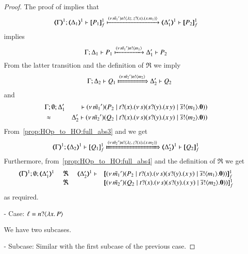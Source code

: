 \begin{proof}
	\noi The proof of  implies that
%
	\[
		\horel{\mapt{\Gamma}^{1}}{\mapt{\Delta_1}^{1}}{\pmapp{P_1}{1}{f}}{\hby{\news{\tilde{m_1}'} \bactout{n}{\abs{z}{\binp{z}{x} (\appl{x}{m_1})}}}}{\mapt{\Delta_1'}^{1}}{\pmapp{P_2}{1}{f}}
	\]
%
	\noi implies
%
	\[
		\Gamma; \Delta_1 \vdash P_1 \xmapsto{(\nu\, \tilde{m_1}') n !\langle m_1 \rangle} \Delta_1' \vdash P_2
	\]
%
	\noi From the latter transition and the definition of $\Re$ we imply
%
	\begin{eqnarray}
		&&\horel{\Gamma}{\Delta_2}{Q_1}{\Hby{\news{\tilde{m_2}'} \bactout{n}{m_2}}}{\Delta_2'}{Q_2}
		\label{prop:HOp_to_HO:full_abs3}
	\end{eqnarray}
%
	\noi and
%
	\begin{eqnarray}
		& \Gamma; \emptyset; \Delta_1' & \vdash (\nu\, \tilde{m_1}')(P_2 \;|\; t ? (x) . (\nu\, s)(s ? (y) . (x\, {y}) \;|\; \overline{s} ! \langle m_1 \rangle . \mathbf{0})) \nonumber \\
		& \approx & \Delta_2' \vdash (\nu\, \tilde{m_2}')(Q_2 \;|\; t ? (x) . (\nu\, s)(s ? (y) . (x\, {y}) \;|\; \overline{s} ! \langle m_2 \rangle . \mathbf{0}))
		\label{prop:HOp_to_HO:full_abs4}
	\end{eqnarray}
%
	\noi From~\eqref{prop:HOp_to_HO:full_abs3} and  we get
%
	\[
		\horel{\mapt{\Gamma}^{1}}{\mapt{\Delta_2}^{1}}{\pmapp{Q_1}{1}{f}}{\Hby{\news{\tilde{m_2}'} \bactout{n}{\abs{z}{\binp{z}{x} (\appl{x}{m_2})}}}}{\mapt{\Delta_2'}^{1}}{\pmapp{Q_2}{1}{f}}
	\]
%
	\noi Furthermore, from~\eqref{prop:HOp_to_HO:full_abs4} and the definition of $\Re$ we get
%
	\[
		\mhorel{\mapt{\Gamma}^{1}}{\mapt{\Delta_1'}^{1}}{\pmapp{\newsp{\tilde{m_1}'}{P_2 \Par \hotrigger{t}{x}{s}{m_1}}}{1}{f}}
		{\ \Re\ }{\mapt{\Delta_2'}^{1}}{}{\pmapp{\newsp{\tilde{m_2}'}{Q_2 \Par \hotrigger{t}{x}{s}{m_2}}}{1}{f}}
	\]
%
	\noi as required.

	\noi - Case: $\ell = n ? \langle \lambda x.\,P \rangle$

	\noi We have two subcases.

	\noi - Subcase: Similar with the first subcase of the previous case.


\end{proof}
